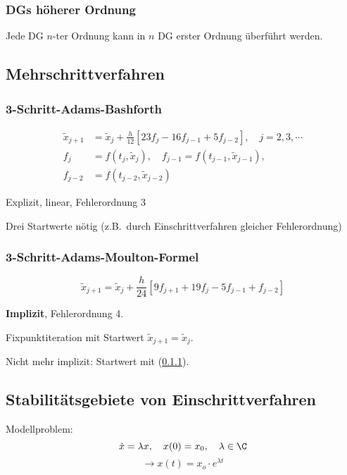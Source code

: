 		\subsubsection{DGs höherer Ordnung}
			Jede DG $n$-ter Ordnung kann in $n$ DG erster Ordnung überführt werden.

	\subsection{Mehrschrittverfahren}
		\subsubsection{3-Schritt-Adams-Bashforth}
			\label{adamsbash}
			\begin{align*}
				\tilde x_{j+1} &= \tilde x_j + \frac{h}{12}\left[ 23f_j- 16f_{j-1} + 5 f_{j-2}\right], \quad j=2,3,\cdots \\
				f_j &= f(t_j,\tilde x_j), \quad f_{j-1}= f(t_{j-1}, \tilde x_{j-1}), \\
				f_{j-2} &= f(t_{j-2},\tilde x_{j-2})
			\end{align*}

			\begin{tightitemize}
				\item Explizit, linear, Fehlerordnung 3
				\item Drei Startwerte nötig (z.B.~durch Einschrittverfahren gleicher Fehlerordnung)
			\end{tightitemize}

		\subsubsection{3-Schritt-Adams-Moulton-Formel}
			\[
				\tilde x_{j+1}=\tilde x_j + \frac{h}{24}\left[ 9f_{j+1} + 19 f_j - 5 f_{j-1} + f_{j-2}\right]
			\]
			\begin{tightitemize}
				\item \textbf{Implizit}, Fehlerordnung 4.
				\item Fixpunktiteration mit Startwert $\tilde x_{j+1}=\tilde x_j$.
				\item Nicht mehr implizit: Startwert mit (\ref{adamsbash}).
			\end{tightitemize}

	\subsection{Stabilitätsgebiete von Einschrittverfahren}
		Modellproblem:
		\begin{equation}
			\dot x = \lambda x, \quad x(0)=x_0, \quad \lambda \in \C \label{modellproblem}
		\end{equation}
		\[
			\rightarrow x(t) = x_o\cdot e^{\lambda t}
		\]

